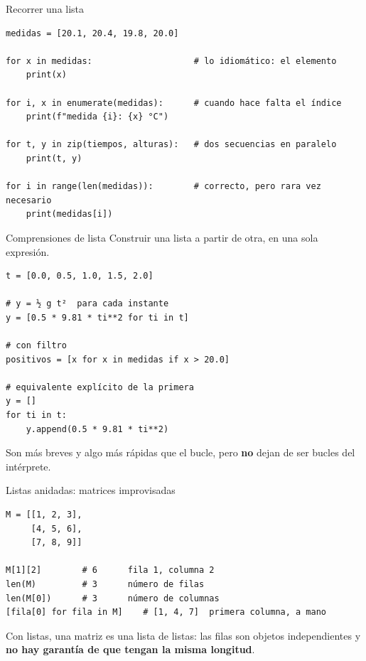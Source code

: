 \documentclass[aspectratio=169, 11pt]{beamer}
\begin{document}
\begin{frame}[fragile]{Recorrer una lista}
\begin{lstlisting}
medidas = [20.1, 20.4, 19.8, 20.0]

for x in medidas:                    # lo idiomático: el elemento
    print(x)

for i, x in enumerate(medidas):      # cuando hace falta el índice
    print(f"medida {i}: {x} °C")

for t, y in zip(tiempos, alturas):   # dos secuencias en paralelo
    print(t, y)

for i in range(len(medidas)):        # correcto, pero rara vez necesario
    print(medidas[i])
\end{lstlisting}
\end{frame}

\begin{frame}[fragile]{Comprensiones de lista}
Construir una lista a partir de otra, en una sola expresión.

\begin{lstlisting}
t = [0.0, 0.5, 1.0, 1.5, 2.0]

# y = ½ g t²  para cada instante
y = [0.5 * 9.81 * ti**2 for ti in t]

# con filtro
positivos = [x for x in medidas if x > 20.0]

# equivalente explícito de la primera
y = []
for ti in t:
    y.append(0.5 * 9.81 * ti**2)
\end{lstlisting}

Son más breves y algo más rápidas que el bucle, pero \textbf{no} dejan de ser
bucles del intérprete.
\end{frame}

\begin{frame}[fragile]{Listas anidadas: matrices improvisadas}
\begin{lstlisting}
M = [[1, 2, 3],
     [4, 5, 6],
     [7, 8, 9]]

M[1][2]        # 6      fila 1, columna 2
len(M)         # 3      número de filas
len(M[0])      # 3      número de columnas
[fila[0] for fila in M]    # [1, 4, 7]  primera columna, a mano
\end{lstlisting}

Con listas, una matriz es una lista de listas: las filas son objetos
independientes y \textbf{no hay garantía de que tengan la misma longitud}.
\end{frame}
\end{document}
